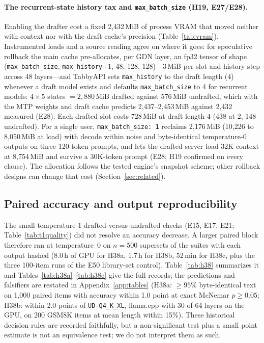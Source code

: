 \documentclass[11pt]{article}
\newcommand{\q}[1]{\texttt{#1}}
\begin{document}
\paragraph{The recurrent-state history tax and \q{max\_batch\_size} (H19, E27/E28).}
Enabling the drafter cost a fixed 2,432\,MiB of process VRAM that moved
neither with context nor with the draft cache's precision
(Table~\ref{tab:vram}). Instrumented loads and a source reading agree on where
it goes: for speculative rollback the main cache pre-allocates, per GDN
layer, an fp32 tensor of shape (\q{max\_batch\_size}, \q{max\_history}$+1$,
48, 128, 128)---3\,MiB per slot and history step across 48 layers---and
TabbyAPI sets \q{max\_history} to the draft length (4) whenever a draft model
exists and defaults \q{max\_batch\_size} to 4 for recurrent models:
$4\times5$ states $=2{,}880$\,MiB drafted against 576\,MiB undrafted, which
with the MTP weights and draft cache predicts 2,437--2,453\,MiB against 2,432
measured (E28). Each drafted slot costs 728\,MiB at draft length 4 (438 at 2,
148 undrafted). For a single user, \q{max\_batch\_size: 1} reclaims
2,176\,MiB (10,226 to 8,050\,MiB at load) with decode within noise and
byte-identical temperature-0 outputs on three 120-token prompts, and lets
the drafted server load 32K context at 8,754\,MiB and survive a 30K-token
prompt (E28; H19 confirmed on every clause). The allocation follows the tested
engine's snapshot scheme; other rollback designs can change that cost
(Section~\ref{sec:related}).

\subsection{Paired accuracy and output reproducibility}
\label{sec:hardening}

The small temperature-1 drafted-versus-undrafted checks (E15, E17, E21;
Table~\ref{tab:t1quality}) did not resolve an accuracy decrease. A larger
paired block therefore ran at temperature~0 on $n=500$ supersets of the suites
with each output hashed (8.0\,h of GPU for H38a, 1.7\,h for H38b, 52\,min
for H38c, plus the three 100-item runs of the E50 library-set control).
Table~\ref{tab:h38} summarizes it and Tables~\ref{tab:h38a}--\ref{tab:h38c}
give the full records; the predictions and falsifiers are restated in
Appendix~\ref{app:tables} (H38a: $\ge95\%$ byte-identical text on 1,000
paired items with accuracy within 1.0 point at exact McNemar $p\ge0.05$;
H38b: within 2.0 points of \q{UD-Q4\_K\_XL}, llama.cpp with 30 of 64 layers
on the GPU, on 200 GSM8K items at mean length within 15\%). These historical
decision rules are recorded faithfully, but a non-significant test plus a
small point estimate is not an equivalence test; we do not interpret them as such.
\end{document}
